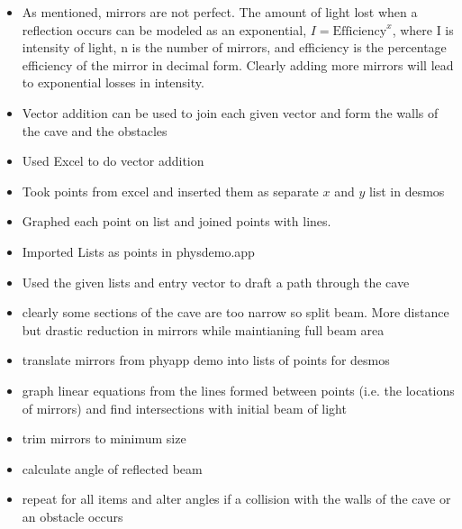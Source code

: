 \documentclass[11pt, letterpaper]{article}
\begin{document}
\begin{itemize}
	
\item	As mentioned, mirrors are not perfect. The amount of light lost when a reflection occurs can be modeled as an exponential, $I=\textrm{Efficiency}^x$, where I is intensity of light, n is the number of mirrors, and efficiency is the percentage efficiency of the mirror in decimal form. Clearly  adding more mirrors will lead to exponential losses in intensity.

\item Vector addition can be used to join each given vector and form the walls of the cave and the obstacles

\item Used Excel to do vector addition

\item Took points from excel and inserted them as separate $x$ and $y$ list in desmos

\item Graphed each point on list and joined points with lines.

\item Imported Lists as points in physdemo.app

\item Used the given lists and entry vector to draft a path through the cave

\item  clearly some sections of the cave are too narrow so split beam. More distance but drastic reduction in mirrors while maintianing full beam area

\item translate mirrors from phyapp demo into lists of points for desmos

\item graph linear equations from the lines formed between points (i.e. the locations of mirrors) and find intersections with initial beam of light

\item  trim mirrors to minimum size

\item calculate angle of reflected beam 

\item repeat for all items and alter angles if a collision with the walls of the cave or an obstacle occurs
\end{itemize}


\par 
\end{document}
